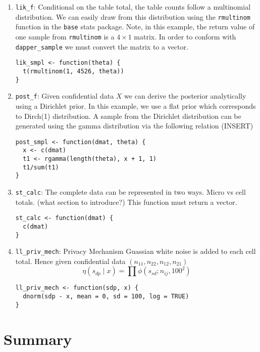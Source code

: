\begin{enumerate}
\def\labelenumi{\arabic{enumi}.}
\item
  \texttt{lik\_f}: Conditional on the table total, the table counts follow a multinomial
  distribution. We can easily draw from this distribution using the
  \texttt{rmultinom} function in the \texttt{base} stats package. Note, in this example,
  the return value of one sample from \texttt{rmultinom} is a \(4 \times 1\) matrix. In order to
  conform with \texttt{dapper\_sample} we must convert the matrix to a vector.

\begin{verbatim}
lik_smpl <- function(theta) {
  t(rmultinom(1, 4526, theta))
}
\end{verbatim}
\item
  \texttt{post\_f}: Given confidential data \(X\) we can derive the posterior analytically
  using a Dirichlet prior. In this example, we use a flat prior which
  corresponds to Dirch(1) distribution. A sample from the Dirichlet distribution
  can be generated using the gamma distribution via the following relation (INSERT)

\begin{verbatim}
post_smpl <- function(dmat, theta) {
  x <- c(dmat)
  t1 <- rgamma(length(theta), x + 1, 1)
  t1/sum(t1)
}
\end{verbatim}
\item
  \texttt{st\_calc}: The complete data can be represented in two ways. Micro vs cell totals.
  (what section to introduce?) This function must return a vector.

\begin{verbatim}
st_calc <- function(dmat) {
  c(dmat)
}
\end{verbatim}
\item
  \texttt{ll\_priv\_mech}: Privacy Mechanism
  Guassian white noise is added to each cell total. Hence given
  confidential data \((n_{11}, n_{22}, n_{12}, n_{21})\)
  \[
  \eta(s_{dp} \mid x) = \prod \phi(s_{sd}; n_{ij}, 100^2)
  \]

\begin{verbatim}
ll_priv_mech <- function(sdp, x) {
  dnorm(sdp - x, mean = 0, sd = 100, log = TRUE)
}
\end{verbatim}
\end{enumerate}

\hypertarget{summary}{%
\section{Summary}\label{summary}}


